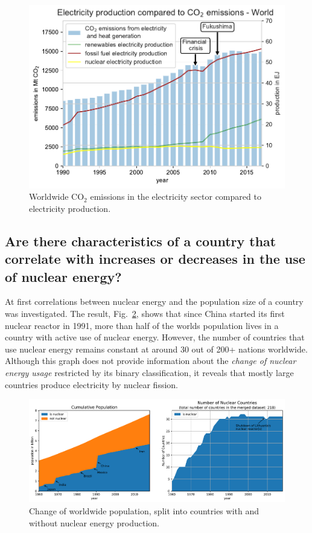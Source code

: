 \documentclass[a4paper,10pt,twocolumn]{scrartcl}
\begin{document}
\begin{figure}[h]
	\centering
 	\includegraphics[width=\columnwidth]{../figures/q2/q2_plot_world_abs.pdf}
 	\caption{Worldwide CO$_2$ emissions in the electricity sector compared to electricity production.}
 	\label{fig:q2_plot1}
\end{figure}


\subsection{Are there characteristics of a country that correlate with increases or decreases in the use of nuclear energy?}

At first correlations between nuclear energy and the population size of a country was investigated. The result, Fig.~\ref{fig:q3_population}, shows that since China started its first nuclear reactor in 1991, more than half of the worlds population lives in a country with active use of nuclear energy. However, the number of countries that use nuclear energy remains constant at around 30 out of 200+ nations worldwide. Although this graph does not provide information about the \emph{change of nuclear energy usage} restricted by its binary classification, it reveals that mostly large countries produce electricity by nuclear fission.

\begin{figure}[hbt]
	\centering
	\includegraphics[width=\columnwidth, trim=0 0 160mm 0, clip]{../figures/q3_population.pdf}
	\caption{Change of worldwide population, split into countries with and without nuclear energy production.}
	\label{fig:q3_population}
\end{figure}
\end{document}
